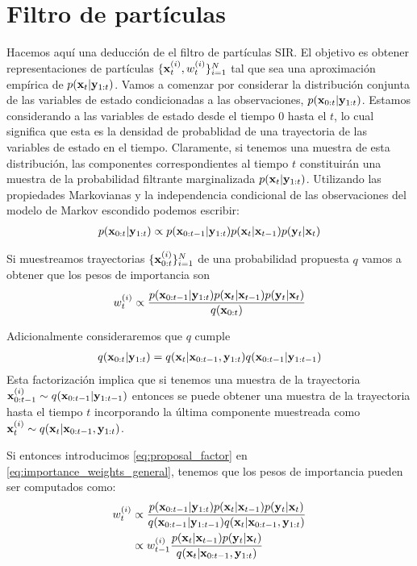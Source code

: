 \section{Filtro de partículas}\label{appendix:pf}

Hacemos aquí una deducción de el filtro de partículas SIR. El objetivo es obtener representaciones de partículas $\{\mathbf{x}_t^{(i)}, w_t^{(i)}\}_{i=1}^{N}$ tal que sea una aproximación empírica de $p(\mathbf{x}_t | \mathbf{y}_{1:t})$. Vamos a comenzar por considerar la distribución conjunta de las variables de estado condicionadas a las observaciones, $p(\mathbf{x}_{0:t} | \mathbf{y}_{1:t})$. Estamos considerando a las variables de estado desde el tiempo $0$ hasta el $t$, lo cual significa que esta es la densidad de probablidad de una trayectoria de las variables de estado en el tiempo. Claramente, si tenemos una muestra de esta distribución, las componentes correspondientes al tiempo $t$ constituirán una muestra de la probabilidad filtrante marginalizada $p(\mathbf{x}_t | \mathbf{y}_{1:t})$. Utilizando las propiedades Markovianas y la independencia condicional de las observaciones del modelo de Markov escondido podemos escribir:
\begin{align*}
    p(\mathbf{x}_{0:t} | \mathbf{y}_{1:t}) \propto p(\mathbf{x}_{0:t-1} | \mathbf{y}_{1:t}) p(\mathbf{x}_t | \mathbf{x}_{t-1}) p(\mathbf{y}_t | \mathbf{x}_t)
\end{align*}

Si muestreamos trayectorias $\{\mathbf{x}_{0:t}^{(i)}\}_{i=1}^N$ de una probabilidad propuesta $q$ vamos a obtener que los pesos de importancia son 
\begin{align}\label{eq:importance_weights_general}
    w_t^{(i)} \propto \frac{p(\mathbf{x}_{0:t-1} | \mathbf{y}_{1:t}) p(\mathbf{x}_t | \mathbf{x}_{t-1}) p(\mathbf{y}_t | \mathbf{x}_t)}{q(\mathbf{x}_{0:t})}
\end{align}

Adicionalmente consideraremos que $q$ cumple 
\begin{align}\label{eq:proposal_factor}
    q(\mathbf{x}_{0:t} | \mathbf{y}_{1:t}) = q(\mathbf{x}_t | \mathbf{x}_{0:t-1}, \mathbf{y}_{1:t}) q(\mathbf{x}_{0:t-1} | \mathbf{y}_{1:t-1})
\end{align}
Esta factorización implica que si tenemos una muestra de la trayectoria $\mathbf{x}_{0:t-1}^{(i)} \sim q(\mathbf{x}_{0:t-1} | \mathbf{y}_{1:t-1})$ entonces se puede obtener una muestra de la trayectoria hasta el tiempo $t$ incorporando la última componente muestreada como $\mathbf{x}_t^{(i)} \sim q(\mathbf{x}_t | \mathbf{x}_{0:t-1}, \mathbf{y}_{1:t})$.

Si entonces introducimos \ref{eq:proposal_factor} en \ref{eq:importance_weights_general}, tenemos que los pesos de importancia pueden ser computados como:
\begin{align*}
    w_t^{(i)} &\propto \frac{p(\mathbf{x}_{0:t-1} | \mathbf{y}_{1:t}) p(\mathbf{x}_t | \mathbf{x}_{t-1}) p(\mathbf{y}_t | \mathbf{x}_t)}{q(\mathbf{x}_{0:t-1} | \mathbf{y}_{1:t-1}) q(\mathbf{x}_t | \mathbf{x}_{0:t-1},  \mathbf{y}_{1:t})} \\
    &\propto w_{t-1}^{(i)} \frac{p(\mathbf{x}_t | \mathbf{x}_{t-1}) p(\mathbf{y}_t | \mathbf{x}_t)}{q(\mathbf{x}_t | \mathbf{x}_{0:t-1},  \mathbf{y}_{1:t})}
\end{align*}

